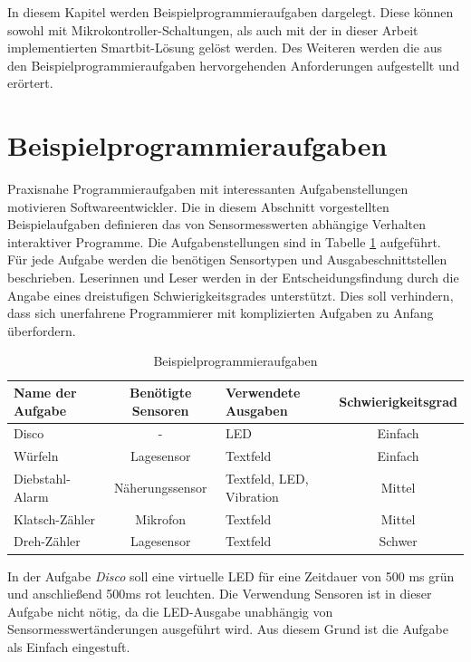 \documentclass[11pt,a4paper]{report}
\begin{document}
In diesem Kapitel werden Beispielprogrammieraufgaben dargelegt.
Diese können sowohl mit Mikrokontroller-Schaltungen, als auch mit der in dieser Arbeit implementierten Smartbit-Lösung gelöst werden.
Des Weiteren werden die aus den Beispielprogrammieraufgaben hervorgehenden Anforderungen aufgestellt und erörtert.

\section{Beispielprogrammieraufgaben}\label{sec:activities}
Praxisnahe Programmieraufgaben mit interessanten Aufgabenstellungen motivieren Softwareentwickler.
Die in diesem Abschnitt vorgestellten Beispielaufgaben definieren das von Sensormesswerten abhängige Verhalten interaktiver Programme.
Die Aufgabenstellungen sind in Tabelle \ref{tab:excercises} aufgeführt.
Für jede Aufgabe werden die benötigen Sensortypen und Ausgabeschnittstellen beschrieben.
Leserinnen und Leser werden in der Entscheidungsfindung durch die Angabe eines dreistufigen Schwierigkeitsgrades unterstützt.
Dies soll verhindern, dass sich unerfahrene Programmierer mit komplizierten Aufgaben zu Anfang überfordern.
\begin{table}[htbp]
  \centering
  \begin{tabular}{|l|c|p{2.3cm}|c|}
      \hline
      \textbf{Name der Aufgabe} & \textbf{Benötigte Sensoren} & \textbf{Verwendete Ausgaben} & \textbf{Schwierigkeitsgrad} \\
      \hline
      Disco & - & LED & Einfach \\
      \hline
      Würfeln & Lagesensor & Textfeld & Einfach \\
      \hline
      Diebstahl-Alarm & Näherungssensor & Textfeld, LED, Vibration & Mittel \\
      \hline
      Klatsch-Zähler & Mikrofon & Textfeld & Mittel \\
      \hline
      Dreh-Zähler & Lagesensor & Textfeld & Schwer \\
      \hline
  \end{tabular}
  \caption{Beispielprogrammieraufgaben}
  \label{tab:excercises}
\end{table}

In der Aufgabe \textit{Disco} soll eine virtuelle LED für eine Zeitdauer von 500 ms grün und anschließend 500ms rot leuchten.
Die Verwendung Sensoren ist in dieser Aufgabe nicht nötig, da die LED-Ausgabe unabhängig von Sensormesswertänderungen ausgeführt wird.
Aus diesem Grund ist die Aufgabe als Einfach eingestuft.
\end{document}

